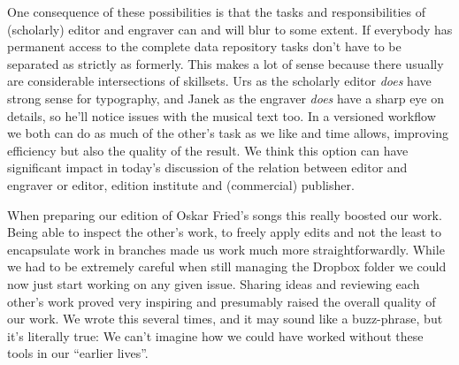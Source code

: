 \documentclass[11pt,a4paper]{article}
\begin{document}
One consequence of these possibilities is that the tasks and responsibilities of
(scholarly) editor and engraver can and will blur to some extent. If everybody has
permanent access to the complete data repository tasks don't have to be separated as
strictly as formerly. This makes a lot of sense because there usually are considerable
intersections of skillsets. Urs as the scholarly editor \emph{does} have strong sense
for typography, and Janek as the engraver \emph{does} have a sharp eye on details, so
he'll notice issues with the musical text too. In a versioned workflow we both can do
as much of the other's task as we like and time allows, improving efficiency but also
the quality of the result. We think this option can have significant impact in today's
discussion of the relation between editor and engraver or editor, edition institute and
(commercial) publisher.

When preparing our edition of Oskar Fried's songs this really boosted our work. Being
able to inspect the other's work, to freely apply edits and not the least to encapsulate
work in branches made us work much more straightforwardly. While we had to be
extremely careful when still managing the Dropbox folder we could now just start working
on any given issue. Sharing ideas and reviewing each other's work proved very inspiring
and presumably raised the overall quality of our work. We wrote this several times, and
it may sound like a buzz-phrase, but it's literally true: We can't imagine how we could
have worked without these tools in our “earlier lives”.
\end{document}
